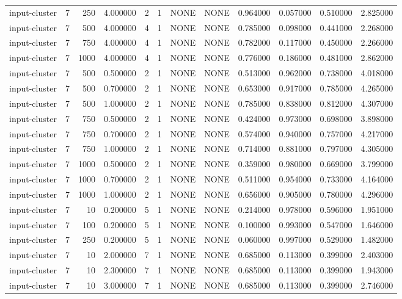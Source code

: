 \begin{tabular}{lrrrllllrrrr}
input-cluster & 7 & 250 & 4.000000 & 2 & 1 & NONE & NONE & 0.964000 & 0.057000 & 0.510000 & 2.825000 \\
input-cluster & 7 & 500 & 4.000000 & 4 & 1 & NONE & NONE & 0.785000 & 0.098000 & 0.441000 & 2.268000 \\
input-cluster & 7 & 750 & 4.000000 & 4 & 1 & NONE & NONE & 0.782000 & 0.117000 & 0.450000 & 2.266000 \\
input-cluster & 7 & 1000 & 4.000000 & 4 & 1 & NONE & NONE & 0.776000 & 0.186000 & 0.481000 & 2.862000 \\
input-cluster & 7 & 500 & 0.500000 & 2 & 1 & NONE & NONE & 0.513000 & 0.962000 & 0.738000 & 4.018000 \\
input-cluster & 7 & 500 & 0.700000 & 2 & 1 & NONE & NONE & 0.653000 & 0.917000 & 0.785000 & 4.265000 \\
input-cluster & 7 & 500 & 1.000000 & 2 & 1 & NONE & NONE & 0.785000 & 0.838000 & 0.812000 & 4.307000 \\
input-cluster & 7 & 750 & 0.500000 & 2 & 1 & NONE & NONE & 0.424000 & 0.973000 & 0.698000 & 3.898000 \\
input-cluster & 7 & 750 & 0.700000 & 2 & 1 & NONE & NONE & 0.574000 & 0.940000 & 0.757000 & 4.217000 \\
input-cluster & 7 & 750 & 1.000000 & 2 & 1 & NONE & NONE & 0.714000 & 0.881000 & 0.797000 & 4.305000 \\
input-cluster & 7 & 1000 & 0.500000 & 2 & 1 & NONE & NONE & 0.359000 & 0.980000 & 0.669000 & 3.799000 \\
input-cluster & 7 & 1000 & 0.700000 & 2 & 1 & NONE & NONE & 0.511000 & 0.954000 & 0.733000 & 4.164000 \\
input-cluster & 7 & 1000 & 1.000000 & 2 & 1 & NONE & NONE & 0.656000 & 0.905000 & 0.780000 & 4.296000 \\
input-cluster & 7 & 10 & 0.200000 & 5 & 1 & NONE & NONE & 0.214000 & 0.978000 & 0.596000 & 1.951000 \\
input-cluster & 7 & 100 & 0.200000 & 5 & 1 & NONE & NONE & 0.100000 & 0.993000 & 0.547000 & 1.646000 \\
input-cluster & 7 & 250 & 0.200000 & 5 & 1 & NONE & NONE & 0.060000 & 0.997000 & 0.529000 & 1.482000 \\
input-cluster & 7 & 10 & 2.000000 & 7 & 1 & NONE & NONE & 0.685000 & 0.113000 & 0.399000 & 2.403000 \\
input-cluster & 7 & 10 & 2.300000 & 7 & 1 & NONE & NONE & 0.685000 & 0.113000 & 0.399000 & 1.943000 \\
input-cluster & 7 & 10 & 3.000000 & 7 & 1 & NONE & NONE & 0.685000 & 0.113000 & 0.399000 & 2.746000 \\

\end{tabular}
